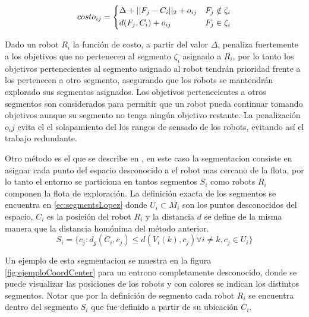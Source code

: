 \begin{equation}\label{ec:costsolanas}
costo_{ij} = 
\begin{dcases}
  \Delta + || F_j - C_i ||_2 + o_{ij} & F_j \notin \zeta_i \\
  d(F_j, C_i) + o_{ij}                & F_j \in    \zeta_i
\end{dcases}
\end{equation}

Dado un robot $R_i$ la función de costo, a partir del valor $\Delta$, penaliza fuertemente a los objetivos que no pertenecen al segmento $\zeta_i$ asignado a $R_i$, por lo tanto los objetivos pertenecientes al segmento asignado al robot tendrán prioridad frente a los pertenecen a otro segmento, asegurando que los robots se mantendrán explorado sus segmentos asignados. Los objetivos pertenecientes a otros segmentos son considerados para permitir que un robot pueda continuar tomando objetivos aunque su segmento no tenga ningún objetivo restante. La penalización $o_ij$ evita el el solapamiento del los rangos de sensado de los robots, evitando así el trabajo redundante.\medbreak

Otro método es el que se describe en \cite{Lopez-Perez2018}, en este caso la segmentacion consiste en asignar cada punto del espacio desconocido a el robot mas cercano de la flota, por lo tanto el entorno se particiona en tantos segmentos $S_i$ como robots $R_i$ componen la flota de exploración. La definición exacta de los segmentos se encuentra en \eqref{ec:segmentsLopez} donde $U_i \subset M_i$ son los puntos desconocidos del espacio, $C_i$ es la posición del robot $R_i$ y la distancia $d$ se define de la misma manera que la distancia homónima del método anterior.
\begin{equation}\label{ec:segmentsLopez}
  S_i=\{c_j:d_g(C_i,c_j)\leq d(V_i(k),c_j) \forall i \neq k , c_j \in U_i\}
\end{equation}


Un ejemplo de esta segmentacion se muestra en la figura \ref{fig:ejemploCoordCenter} para un entrono completamente desconocido, donde se puede visualizar las posiciones de los robots y con colores se indican los distintos segmentos. Notar que por la definición de segmento cada robot $R_i$ se encuentra dentro del segmento $S_i$ que fue definido a partir de su ubicación $C_i$. %

